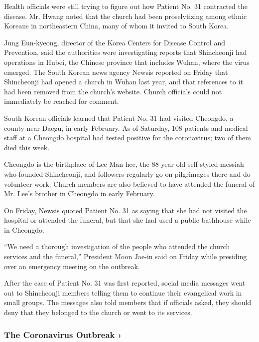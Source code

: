 Health officials were still trying to figure out how Patient No. 31
contracted the disease. Mr. Hwang noted that the church had been
proselytizing among ethnic Koreans in northeastern China, many of whom
it invited to South Korea.

Jung Eun-kyeong, director of the Korea Centers for Disease Control and
Prevention, said the authorities were investigating reports that
Shincheonji had operations in Hubei, the Chinese province that includes
Wuhan, where the virus emerged. The South Korean news agency Newsis
reported on Friday that Shincheonji had opened a church in Wuhan last
year, and that references to it had been removed from the church's
website. Church officials could not immediately be reached for comment.

South Korean officials learned that Patient No. 31 had visited Cheongdo,
a county near Daegu, in early February. As of Saturday, 108 patients and
medical staff at a Cheongdo hospital had tested positive for the
coronavirus; two of them died this week.

Cheongdo is the birthplace of Lee Man-hee, the 88-year-old self-styled
messiah who founded Shincheonji, and followers regularly go on
pilgrimages there and do volunteer work. Church members are also
believed to have attended the funeral of Mr. Lee's brother in Cheongdo
in early February.

On Friday, Newsis quoted Patient No. 31 as saying that she had not
visited the hospital or attended the funeral, but that she had used a
public bathhouse while in Cheongdo.

``We need a thorough investigation of the people who attended the church
services and the funeral,'' President Moon Jae-in said on Friday while
presiding over an emergency meeting on the outbreak.

After the case of Patient No. 31 was first reported, social media
messages went out to Shincheonji members telling them to continue their
evangelical work in small groups. The messages also told members that if
officials asked, they should deny that they belonged to the church or
went to its services.

\href{https://www.nytimes.com/news-event/coronavirus?action=click\&pgtype=Article\&state=default\&region=MAIN_CONTENT_3\&context=storylines_faq}{}

\hypertarget{the-coronavirus-outbreak-}{%
\subsubsection{The Coronavirus Outbreak
›}\label{the-coronavirus-outbreak-}}

